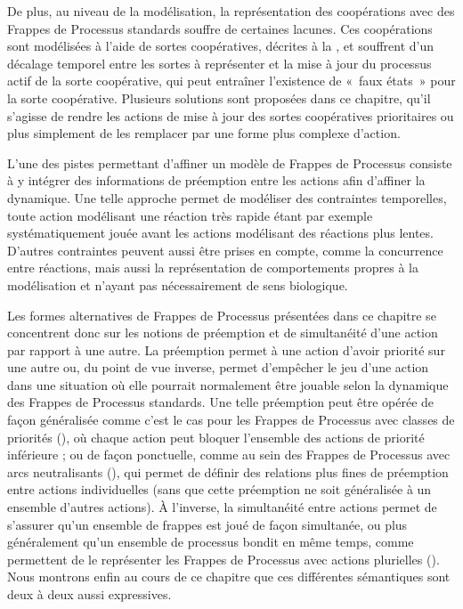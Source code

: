 De plus, au niveau de la modélisation, la représentation des coopérations avec des Frappes de
Processus standards souffre de certaines lacunes.
Ces coopérations sont modélisées à l'aide de sortes coopératives, décrites à la ,
et souffrent d'un décalage temporel entre les sortes à représenter et
la mise à jour du processus actif de la sorte coopérative,
qui peut entraîner l'existence de «~faux états~» pour la sorte coopérative.
Plusieurs solutions sont proposées dans ce chapitre, qu'il s'agisse de rendre les actions de mise à
jour des sortes coopératives prioritaires ou plus simplement de les remplacer par une forme plus
complexe d'action.

L'une des pistes permettant d'affiner un modèle de Frappes de Processus consiste à y intégrer
des informations de préemption entre les actions afin d'affiner la dynamique.
Une telle approche permet de modéliser des contraintes temporelles,
toute action modélisant une réaction très rapide étant par exemple systématiquement jouée
avant les actions modélisant des réactions plus lentes.
D'autres contraintes peuvent aussi être prises en compte, comme la concurrence entre réactions,
mais aussi la représentation de comportements propres à la modélisation et n'ayant pas nécessairement
de sens biologique.

Les formes alternatives de Frappes de Processus présentées dans ce chapitre se concen\-trent donc
sur les notions de préemption et de simultanéité d'une action par rapport à une autre.
La préemption permet à une action d'avoir priorité sur une autre ou, du point de vue inverse,
permet d'empêcher le jeu d'une action dans une situation où elle pourrait normalement être jouable
selon la dynamique des Frappes de Processus standards.
Une telle préemption peut être opérée de façon généralisée
comme c'est le cas pour les Frappes de Processus avec classes de priorités (),
où chaque action peut bloquer l'ensemble des actions de priorité inférieure ;
ou de façon ponctuelle, comme au sein des Frappes de Processus avec arcs neutralisants
(),
qui permet de définir des relations plus fines de préemption entre actions individuelles
(sans que cette préemption ne soit généralisée à un ensemble d'autres actions).
À l'inverse, la simultanéité entre actions permet de s'assurer qu'un ensemble de frappes est joué
de façon simultanée, ou plus généralement qu'un ensemble de processus bondit en même temps,
comme permettent de le représenter les Frappes de Processus avec actions plurielles ().
Nous montrons enfin au cours de ce chapitre que ces différentes sémantiques sont deux à deux aussi
expressives.

